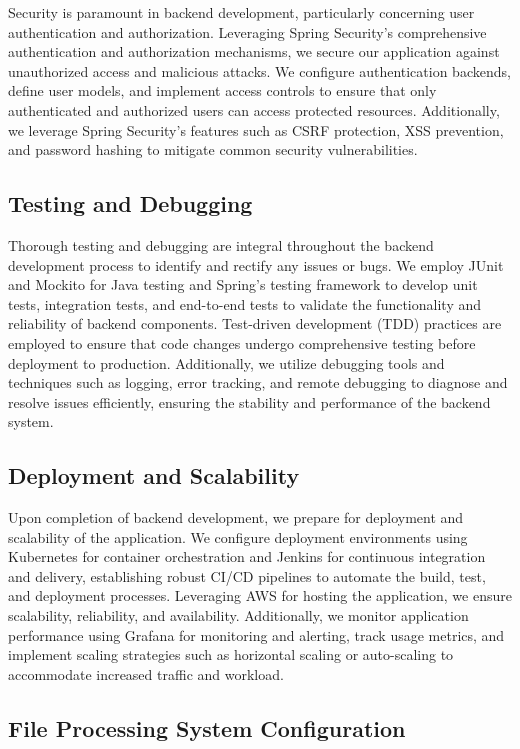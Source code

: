 \documentclass[12pt,a4paper]{report}
\begin{document}
Security is paramount in backend development, particularly concerning user authentication and authorization. Leveraging Spring Security's comprehensive authentication and authorization mechanisms, we secure our application against unauthorized access and malicious attacks. We configure authentication backends, define user models, and implement access controls to ensure that only authenticated and authorized users can access protected resources. Additionally, we leverage Spring Security's features such as CSRF protection, XSS prevention, and password hashing to mitigate common security vulnerabilities.

\subsection{Testing and Debugging}

Thorough testing and debugging are integral throughout the backend development process to identify and rectify any issues or bugs. We employ JUnit and Mockito for Java testing and Spring's testing framework to develop unit tests, integration tests, and end-to-end tests to validate the functionality and reliability of backend components. Test-driven development (TDD) practices are employed to ensure that code changes undergo comprehensive testing before deployment to production. Additionally, we utilize debugging tools and techniques such as logging, error tracking, and remote debugging to diagnose and resolve issues efficiently, ensuring the stability and performance of the backend system.

\subsection{Deployment and Scalability}

Upon completion of backend development, we prepare for deployment and scalability of the application. We configure deployment environments using Kubernetes for container orchestration and Jenkins for continuous integration and delivery, establishing robust CI/CD pipelines to automate the build, test, and deployment processes. Leveraging AWS for hosting the application, we ensure scalability, reliability, and availability. Additionally, we monitor application performance using Grafana for monitoring and alerting, track usage metrics, and implement scaling strategies such as horizontal scaling or auto-scaling to accommodate increased traffic and workload.

\subsection{File Processing System Configuration}
\end{document}
